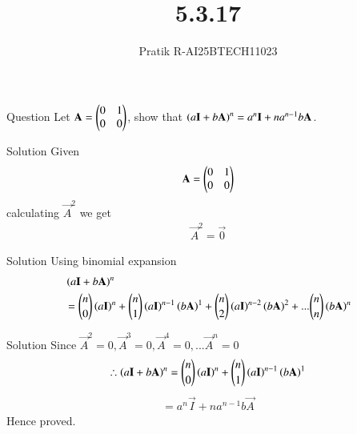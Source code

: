 \documentclass{beamer}
\title 
{5.3.17}
\author 
{Pratik R-AI25BTECH11023}
\begin{document}
\frame{\titlepage}
\begin{frame}{Question}
Let $\mathbf{A}= \begin{pmatrix}0&1\\0&0\end{pmatrix}$, show that $\left(a\mathbf{I} + b\mathbf{A}\right)^n = a^n\mathbf{I} + na^{n-1}b\mathbf{A}$.
\end{frame}
\begin{frame}{Solution}
Given
\begin{align}
  \mathbf{A}= \begin{pmatrix}0&1\\0&0\end{pmatrix}
\end{align}
calculating $\vec{A}^2$ we get 
\begin{align}
   \vec{A}^2 = \vec{0}
\end{align}
\end{frame}
\begin{frame}{Solution}
Using binomial expansion
\begin{align}
&\left(a\mathbf{I} + b\mathbf{A}\right)^n\\
&={n\choose 0}\left(a\mathbf{I}\right)^n + {n\choose 1}\left(a\mathbf{I}\right)^{n-1}\left(b\mathbf{A}\right)^{1} + {n\choose 2}\left(a\mathbf{I}\right)^{n-2}\left(b\mathbf{A}\right)^{2} +... {n\choose n}\left(b\mathbf{A}\right)^{n}
\end{align}
\end{frame}
\begin{frame}{Solution}
Since $\vec{A}^2 =0, \vec{A}^3 =0, \vec{A}^4=0,...\vec{A}^n =0$
\begin{align}
   \therefore \left(a\mathbf{I} + b\mathbf{A}\right)^n = {n\choose 0}\left(a\mathbf{I}\right)^n + {n\choose 1}\left(a\mathbf{I}\right)^{n-1}\left(b\mathbf{A}\right)^{1}
\end{align}
\begin{align}
   = a^n\vec{I} + na^{n-1}b\vec{A}
\end{align}
Hence proved.
\end{frame}
\end{document}
